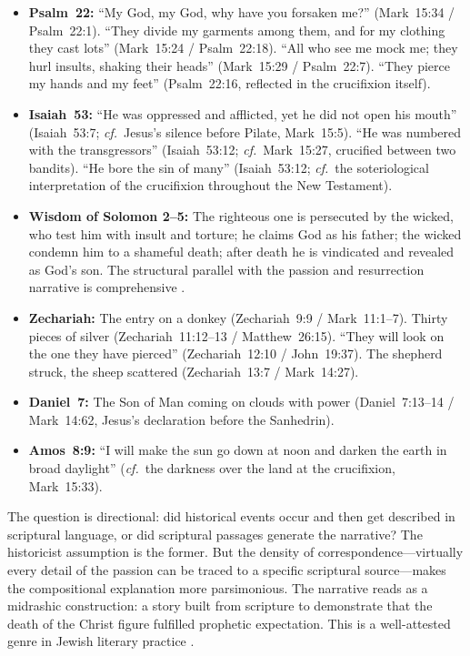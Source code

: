 \documentclass[12pt,oneside]{article}
\newcommand{\cf}{\textit{cf.}}
\begin{document}
\begin{itemize}[leftmargin=2em]
\item \textbf{Psalm~22:} ``My God, my God, why have you forsaken me?''
(Mark~15:34 / Psalm~22:1).  ``They divide my garments among them, and
for my clothing they cast lots'' (Mark~15:24 / Psalm~22:18).
``All who see me mock me; they hurl insults, shaking their heads''
(Mark~15:29 / Psalm~22:7).  ``They pierce my hands and my feet''
(Psalm~22:16, reflected in the crucifixion itself).

\item \textbf{Isaiah~53:} ``He was oppressed and afflicted, yet he did
not open his mouth'' (Isaiah~53:7; \cf\ Jesus's silence before
Pilate, Mark~15:5).  ``He was numbered with the transgressors''
(Isaiah~53:12; \cf\ Mark~15:27, crucified between two bandits).
``He bore the sin of many'' (Isaiah~53:12; \cf\ the soteriological
interpretation of the crucifixion throughout the New Testament).

\item \textbf{Wisdom of Solomon 2--5:} The righteous one is
persecuted by the wicked, who test him with insult and torture; he
claims God as his father; the wicked condemn him to a shameful death;
after death he is vindicated and revealed as God's son.  The
structural parallel with the passion and resurrection narrative is
comprehensive \citep{Nickelsburg1972}.

\item \textbf{Zechariah:} The entry on a donkey (Zechariah~9:9 /
Mark~11:1--7).  Thirty pieces of silver (Zechariah~11:12--13 /
Matthew~26:15).  ``They will look on the one they have pierced''
(Zechariah~12:10 / John~19:37).  The shepherd struck, the sheep
scattered (Zechariah~13:7 / Mark~14:27).

\item \textbf{Daniel~7:} The Son of Man coming on clouds with power
(Daniel~7:13--14 / Mark~14:62, Jesus's declaration before the
Sanhedrin).

\item \textbf{Amos~8:9:} ``I will make the sun go down at noon and
darken the earth in broad daylight'' (\cf\ the darkness over the land
at the crucifixion, Mark~15:33).
\end{itemize}

The question is directional: did historical events occur and then get
described in scriptural language, or did scriptural passages generate
the narrative?  The historicist assumption is the former.  But the
density of correspondence---virtually every detail of the passion can
be traced to a specific scriptural source---makes the compositional
explanation more parsimonious.  The narrative reads as a midrashic
construction: a story built from scripture to demonstrate that the death
of the Christ figure fulfilled prophetic expectation.  This is a
well-attested genre in Jewish literary practice
\citep{Neusner1987,Vermes1973}.
\end{document}
